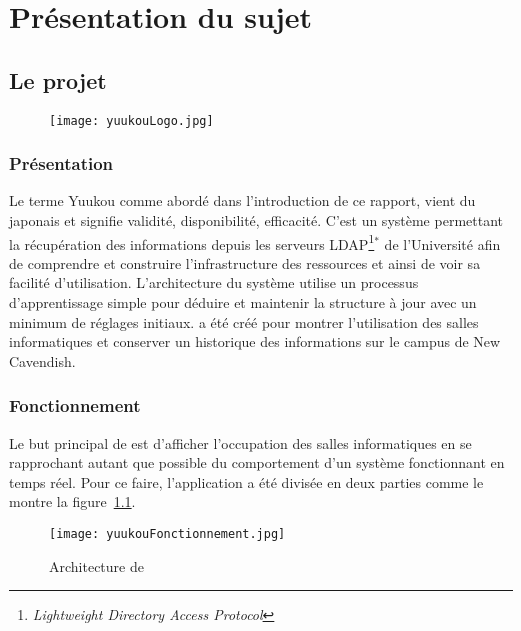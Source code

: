 \chapter{Pr\'esentation du sujet}

\section{Le projet \Yuukou}

\begin{figure}[!ht]
	\centering
	\texttt{[image: yuukouLogo.jpg]}

\end{figure}

\subsection{Pr\'esentation}

Le terme Yuukou comme abord\'e dans l'introduction de ce rapport, vient du japonais \Yuukou{} et signifie validit\'e, disponibilit\'e, efficacit\'e.
C'est un syst\`eme permettant la r\'ecup\'eration des informations depuis les serveurs LDAP\protect\footnote{\textit{Lightweight Directory Access Protocol}}$^*$ de l'Universit\'e afin de comprendre et construire l'infrastructure des ressources et ainsi de voir sa facilit\'e d'utilisation. 
L'architecture du syst\`eme utilise un processus d'apprentissage simple pour d\'eduire et maintenir la structure \`a jour avec un minimum de r\'eglages initiaux.
\Yuukou{} a \'et\'e cr\'e\'e pour montrer l'utilisation des salles informatiques et conserver un historique des informations sur le campus de New Cavendish.

\subsection{Fonctionnement}

Le but principal de \Yuukou{} est d'afficher l'occupation des salles informatiques en se rapprochant autant que possible du comportement d'un syst\`eme fonctionnant en temps r\'eel.
Pour ce faire, l'application a \'et\'e divis\'ee en deux parties  comme le montre la figure~\ref{figure:yuukouFonctionnement}.

\clearpage

\begin{figure}[!ht]
	\centering
	\texttt{[image: yuukouFonctionnement.jpg]}
	\caption{Architecture de \Yuukou}
	\label{figure:yuukouFonctionnement}

\end{figure}


